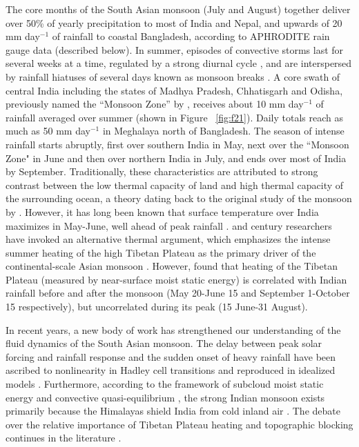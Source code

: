 	The core months of the South Asian monsoon (July and August) together deliver over 50\% of yearly precipitation to most of India and Nepal, and upwards of 20 mm day$^{-1}$ of rainfall to coastal Bangladesh, according to APHRODITE rain gauge data (described below). In summer, episodes of convective storms last for several weeks at a time, regulated by a strong diurnal cycle \citep{Romatschke2011a}, and are interspersed by rainfall hiatuses of several days known as monsoon breaks \citep{Krishnan2000}. A core swath of central India including the states of Madhya Pradesh, Chhatisgarh and Odisha, previously named the ``Monsoon Zone'' by \cite{Gadgil2003}, receives about 10 mm day$^{-1}$ of rainfall averaged over summer (shown in Figure ~\ref{fig:f21}). Daily totals reach as much as 50 mm day$^{-1}$ in Meghalaya north of Bangladesh. The season of intense rainfall starts abruptly, first over southern India in May, next over the ``Monsoon Zone" in June and then over northern India in July, and ends over most of India by September. Traditionally, these characteristics are attributed to strong contrast between the low thermal capacity of land and high thermal capacity of the surrounding ocean, a theory dating back to the original study of the monsoon by \cite{Halley1686}. However, it has long been known that surface temperature over India maximizes in May-June, well ahead of peak rainfall \citep{Gadgil2003}.  and  century researchers have invoked an alternative thermal argument, which emphasizes the intense summer heating of the high Tibetan Plateau as the primary driver of the continental-scale Asian monsoon \citep{Yeh1959,Li1996,Wu2007}. However, \cite{Rajagopalan2013} found that heating of the Tibetan Plateau (measured by near-surface moist static energy) is correlated with Indian rainfall before and after the monsoon  (May 20-June 15 and September 1-October 15 respectively), but uncorrelated during its peak (15 June-31 August).
	
	In recent years, a new body of work has strengthened our understanding of the fluid dynamics of the South Asian monsoon. The delay between peak solar forcing and rainfall response and the sudden onset of heavy rainfall have been ascribed to nonlinearity in Hadley cell transitions and reproduced in idealized models \citep{Plumb1992,Schneider2008,Bordoni2008}. Furthermore, according to the framework of subcloud moist static energy and convective quasi-equilibrium \citep{Emanuel1995,Prive2007,Prive2007a}, the strong Indian monsoon exists primarily because the Himalayas shield India from cold inland air \citep{Boos2010}. The debate over the relative importance of Tibetan Plateau heating and topographic blocking continues in the literature \citep{Wu2012,Boos2013,Qiu2013}.
	
